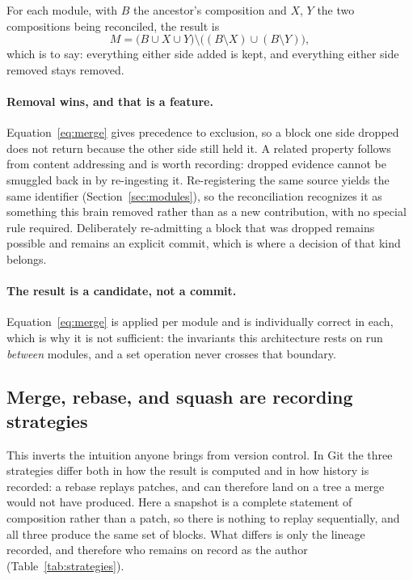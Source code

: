 \documentclass[11pt,a4paper]{article}
\begin{document}
For each module, with $B$ the ancestor's composition and $X$, $Y$ the two
compositions being reconciled, the result is
\begin{equation}
  M = \bigl(B \cup X \cup Y\bigr) \setminus
      \bigl((B \setminus X) \cup (B \setminus Y)\bigr),
  \label{eq:merge}
\end{equation}
which is to say: everything either side added is kept, and everything either
side removed stays removed.

\paragraph{Removal wins, and that is a feature.}
Equation~\ref{eq:merge} gives precedence to exclusion, so a block one side
dropped does not return because the other side still held it. A related property
follows from content addressing and is worth recording: dropped evidence cannot
be smuggled back in by re-ingesting it. Re-registering the same source yields the
same identifier (Section~\ref{sec:modules}), so the reconciliation recognizes it
as something this brain removed rather than as a new contribution, with no
special rule required. Deliberately re-admitting a block that was dropped
remains possible and remains an explicit commit, which is where a decision of
that kind belongs.

\paragraph{The result is a candidate, not a commit.}
Equation~\ref{eq:merge} is applied per module and is individually correct in
each, which is why it is not sufficient: the invariants this architecture
rests on run \emph{between} modules, and a set operation never crosses that
boundary.

\subsection{Merge, rebase, and squash are recording strategies}
\label{sec:strategies}

This inverts the intuition anyone brings from version control. In Git the
three strategies differ both in how the result is computed and in how history
is recorded: a rebase replays patches, and can
therefore land on a tree a merge would not have produced. Here a snapshot is a
complete statement of composition rather than a patch, so there is nothing to
replay sequentially, and all three produce the same set of blocks. What differs
is only the lineage recorded, and therefore who remains on record as the author
(Table~\ref{tab:strategies}).
\end{document}

